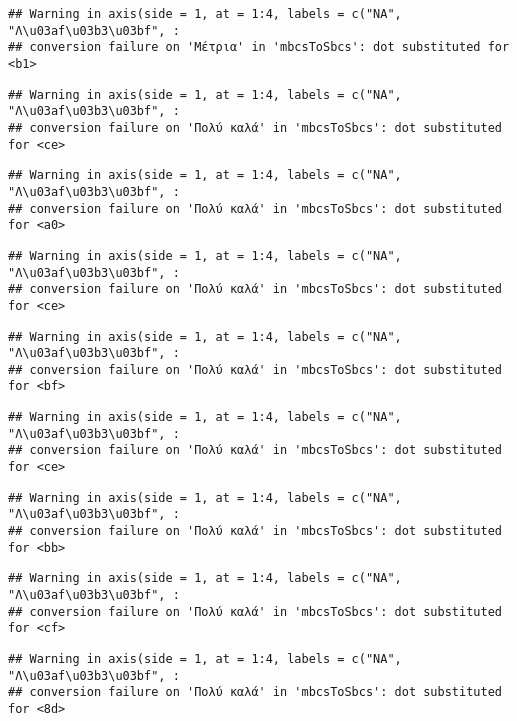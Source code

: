 \documentclass[
]{article}
\begin{document}
\begin{verbatim}
## Warning in axis(side = 1, at = 1:4, labels = c("NA", "Λ\u03af\u03b3\u03bf", :
## conversion failure on 'Μέτρια' in 'mbcsToSbcs': dot substituted for <b1>
\end{verbatim}

\begin{verbatim}
## Warning in axis(side = 1, at = 1:4, labels = c("NA", "Λ\u03af\u03b3\u03bf", :
## conversion failure on 'Πολύ καλά' in 'mbcsToSbcs': dot substituted for <ce>
\end{verbatim}

\begin{verbatim}
## Warning in axis(side = 1, at = 1:4, labels = c("NA", "Λ\u03af\u03b3\u03bf", :
## conversion failure on 'Πολύ καλά' in 'mbcsToSbcs': dot substituted for <a0>
\end{verbatim}

\begin{verbatim}
## Warning in axis(side = 1, at = 1:4, labels = c("NA", "Λ\u03af\u03b3\u03bf", :
## conversion failure on 'Πολύ καλά' in 'mbcsToSbcs': dot substituted for <ce>
\end{verbatim}

\begin{verbatim}
## Warning in axis(side = 1, at = 1:4, labels = c("NA", "Λ\u03af\u03b3\u03bf", :
## conversion failure on 'Πολύ καλά' in 'mbcsToSbcs': dot substituted for <bf>
\end{verbatim}

\begin{verbatim}
## Warning in axis(side = 1, at = 1:4, labels = c("NA", "Λ\u03af\u03b3\u03bf", :
## conversion failure on 'Πολύ καλά' in 'mbcsToSbcs': dot substituted for <ce>
\end{verbatim}

\begin{verbatim}
## Warning in axis(side = 1, at = 1:4, labels = c("NA", "Λ\u03af\u03b3\u03bf", :
## conversion failure on 'Πολύ καλά' in 'mbcsToSbcs': dot substituted for <bb>
\end{verbatim}

\begin{verbatim}
## Warning in axis(side = 1, at = 1:4, labels = c("NA", "Λ\u03af\u03b3\u03bf", :
## conversion failure on 'Πολύ καλά' in 'mbcsToSbcs': dot substituted for <cf>
\end{verbatim}

\begin{verbatim}
## Warning in axis(side = 1, at = 1:4, labels = c("NA", "Λ\u03af\u03b3\u03bf", :
## conversion failure on 'Πολύ καλά' in 'mbcsToSbcs': dot substituted for <8d>
\end{verbatim}
\end{document}
